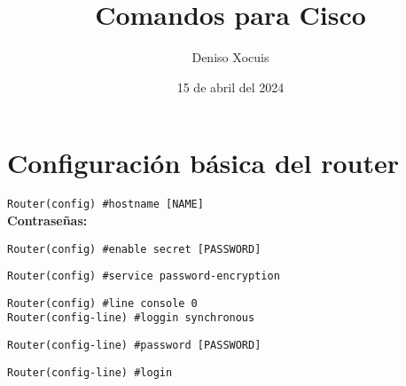 \documentclass[letterpaper,12pt]{article}
\title {\textbf{Comandos para Cisco}}
\author{Deniso Xocuis}
\date{15 de abril del 2024}
\begin{document}
\maketitle
\begin{sloppypar}

\section{Configuración básica del router}

\texttt{Router(config) \#hostname [NAME]}
\vspace{0.3cm}\\ 
\textbf{Contraseñas:} 

\texttt{Router(config) \#enable secret [PASSWORD]}

\texttt{Router(config) \#service password-encryption}

\texttt{Router(config) \#line console 0 \\ Router(config-line) \#loggin synchronous}

\texttt{Router(config-line) \#password [PASSWORD]}

\texttt{Router(config-line) \#login}


\end{sloppypar}
\end{document}
